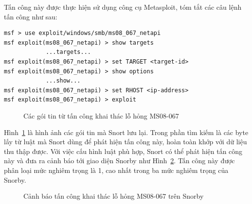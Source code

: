 Tấn công này được thực hiện sử dụng công cụ Metasploit, tóm tắt các câu lệnh tấn công như sau:\\

\begin{lstlisting}
msf > use exploit/windows/smb/ms08_067_netapi
msf exploit(ms08_067_netapi) > show targets
            ...targets...
msf exploit(ms08_067_netapi) > set TARGET <target-id>
msf exploit(ms08_067_netapi) > show options
            ...show...
msf exploit(ms08_067_netapi) > set RHOST <ip-address>
msf exploit(ms08_067_netapi) > exploit
\end{lstlisting}

\begin{figure}[H]
    \centering
    \caption{
        \label{fig:ms08-067-snort-wireshark}
        Các gói tin từ tấn công khai thác lỗ hỏng MS08-067}
\end{figure}

Hình~\ref{fig:ms08-067-snort-wireshark} là hình ảnh các gói tin mà Snort lưu lại. Trong phần tìm kiếm là các byte lấy từ luật mà Snort dùng để phát hiện tấn công này, hoàn toàn khớp với dữ liệu thu thập được. Với việc cấu hình luật phù hợp, Snort có thể phát hiện tấn công này và đưa ra cảnh báo tới giao diện Snorby như Hình~\ref{fig:ms08-067-snort-snorby}. Tấn công này được phân loại mức nghiêm trọng là 1, cao nhất trong ba mức nghiêm trọng của Snorby.

\begin{figure}[H]
    \centering
    \caption{
        \label{fig:ms08-067-snort-snorby}
        Cảnh báo tấn công khai thác lỗ hỏng MS08-067 trên Snorby}
\end{figure}

